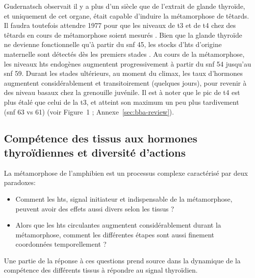 \documentclass[../main.tex]{subfiles}
\begin{document}
		Gudernatsch observait il y a plus d'un siècle que de l'extrait de glande thyroïde, et uniquement de cet organe, était capable d'induire la métamorphose de têtards.
		Il faudra toutefois attendre 1977 pour que les niveaux de \gls{t3} et de \gls{t4} chez des têtards en cours de métamorphose soient mesurés \citep{Leloup1977}.
		Bien que la glande thyroïde ne devienne fonctionnelle qu'à partir du \gls{snf} 45, les stocks d'\glspl{ht} d'origine maternelle sont détectés dès les premiers stades \citep{MorvanDubois2006}.
		Au cours de la métamorphose, les niveaux \glspl{ht} endogènes augmentent progressivement à partir du \gls{snf} 54 jusqu'au \gls{snf} 59.
		Durant les stades ultérieurs, au moment du climax, les taux d'hormones augmentent considérablement et transitoirement (quelques jours), pour revenir à des niveau basaux chez la grenouille juvénile.
		Il est à noter que le pic de \gls{t4} est plus étalé que celui de la \gls{t3}, et atteint son maximum un peu plus tardivement (\gls{snf} 63 vs 61) (voir Figure~1 \citealp{Grimaldi2012}; Annexe~\ref{sec:bba-review}).


	\subsection{Compétence des tissus aux hormones thyroïdiennes et diversité d'actions}\label{tissue-compet-ht}

		La métamorphose de l'amphibien est un processus complexe caractérisé par deux paradoxes:
		\begin{itemize}
		\item Comment les \glspl{ht}, signal initiateur et indispensable de la métamorphose, peuvent avoir des effets aussi divers selon les tissus ? 
		\item Alors que les \glspl{ht} circulantes augmentent considérablement durant la métamorphose, comment les différentes étapes sont aussi finement coordonnées temporellement ?
		\end{itemize}
		\par
		Une partie de la réponse à ces questions prend source dans la dynamique de la compétence des différents tissus à répondre au signal thyroïdien.
\end{document}
